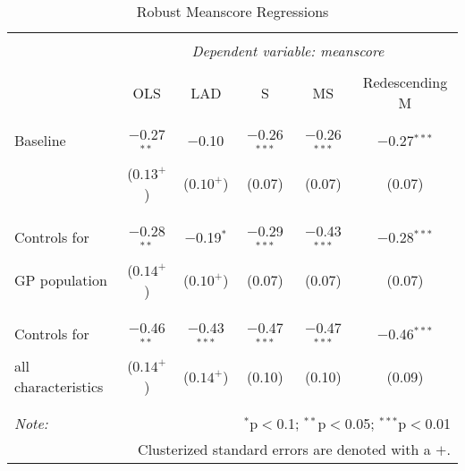 \begin{table}[!htbp] \centering 
  \caption{Robust Meanscore Regressions} 
  \label{meanscore} 
\scriptsize 
\begin{tabular}{@{\extracolsep{5pt}}lccccc} 
\\[-1.8ex]\hline 
\hline \\[-1.8ex] 
 & \multicolumn{5}{c}{\textit{Dependent variable: meanscore}} \\ 
\cline{2-6} \\[-1.8ex] 
 & OLS & LAD & S & MS & Redescending M \\ 
\hline \\[-1.8ex] 
 Baseline & $-$0.27$^{**}$ & $-$0.10$^{}$  & $-$0.26$^{***}$  & $-$0.26$^{***}$ & $-$0.27$^{***}$ \\ 
  & ($0.13^{+}$) & ($0.10^{+}$) &(0.07) & ($0.07$) & (0.07) \\ 
  & \\ 
\hline \\[-1.8ex]
Controls for & $-$0.28$^{**}$ & $-$0.19$^{*}$ & $-$0.29$^{***}$  & $-$0.43$^{***}$ & $-$0.28$^{***}$ \\ 
GP population & ($0.14^{+}$) & ($0.10^{+}$)  & (0.07) & (0.07) & (0.07) \\ 
& \\
\hline \\[-1.8ex]
Controls for & $-$0.46$^{**}$ & $-$0.43$^{***}$  & $-$0.47$^{***}$  & $-$0.47$^{***}$ & $-$0.46$^{***}$ \\ 
all characteristics & ($0.14^{+}$) & ($0.14^{+}$) & (0.10) & (0.10) & (0.09) \\ 
& \\  
\hline \\[-1.8ex]
\hline
\textit{Note:}  & \multicolumn{5}{r}{$^{*}$p$<$0.1; $^{**}$p$<$0.05; $^{***}$p$<$0.01} \\ 
 & \multicolumn{5}{r}{Clusterized standard errors are denoted with a $+$.} \\ 
\end{tabular} 
\end{table}